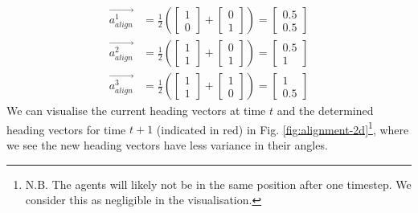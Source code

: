 \documentclass[12pt]{article}
\begin{document}
\begin{equation}
    \begin{aligned}
        \vec{a_{align}^1} &= \frac{1}{2} \left( \begin{bmatrix} 1 \\ 0 \end{bmatrix} + \begin{bmatrix} 0 \\ 1 \end{bmatrix} \right) = \begin{bmatrix} 0.5 \\ 0.5 \end{bmatrix} \\
        \vec{a_{align}^2} &= \frac{1}{2} \left( \begin{bmatrix} 1 \\ 1 \end{bmatrix} + \begin{bmatrix} 0 \\ 1 \end{bmatrix} \right) = \begin{bmatrix} 0.5 \\ 1 \end{bmatrix} \\
        \vec{a_{align}^3} &= \frac{1}{2} \left( \begin{bmatrix} 1 \\ 1 \end{bmatrix} + \begin{bmatrix} 1 \\ 0 \end{bmatrix} \right) = \begin{bmatrix} 1 \\ 0.5 \end{bmatrix}
    \end{aligned}
\end{equation}
We can visualise the current heading vectors at time $t$ and the determined heading vectors for time $t+1$ (indicated in red) in Fig. \ref{fig:alignment-2d}\footnote{N.B. The agents will likely not be in the same position after one timestep. We consider this as negligible in the visualisation.}, where we see the new heading vectors have less variance in their angles.
\end{document}
